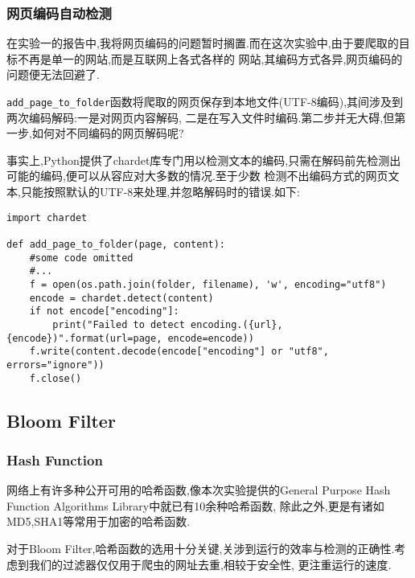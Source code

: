 \documentclass[a4paper]{article}
\begin{document}
            \subsubsection{网页编码自动检测}
在实验一的报告中,我将网页编码的问题暂时搁置.而在这次实验中,由于要爬取的目标不再是单一的网站,而是互联网上各式各样的
网站,其编码方式各异,网页编码的问题便无法回避了.

\texttt{add_page_to_folder}函数将爬取的网页保存到本地文件(UTF-8编码),其间涉及到两次编码解码:一是对网页内容解码,
二是在写入文件时编码.第二步并无大碍,但第一步,如何对不同编码的网页解码呢?

事实上,Python提供了chardet库专门用以检测文本的编码,只需在解码前先检测出可能的编码,便可以从容应对大多数的情况.至于少数
检测不出编码方式的网页文本,只能按照默认的UTF-8来处理,并忽略解码时的错误.如下:

\begin{verbatim}
import chardet

def add_page_to_folder(page, content): 
    #some code omitted
    #...
    f = open(os.path.join(folder, filename), 'w', encoding="utf8")
    encode = chardet.detect(content)
    if not encode["encoding"]:
        print("Failed to detect encoding.({url},{encode})".format(url=page, encode=encode))
    f.write(content.decode(encode["encoding"] or "utf8", errors="ignore"))
    f.close()
\end{verbatim}
        \subsection{Bloom Filter}
            \subsubsection{Hash Function}
网络上有许多种公开可用的哈希函数,像本次实验提供的General Purpose Hash Function Algorithms Library中就已有10余种哈希函数,
除此之外,更是有诸如MD5,SHA1等常用于加密的哈希函数.

对于Bloom Filter,哈希函数的选用十分关键,关涉到运行的效率与检测的正确性.考虑到我们的过滤器仅仅用于爬虫的网址去重,相较于安全性,
更注重运行的速度.
\end{document}
